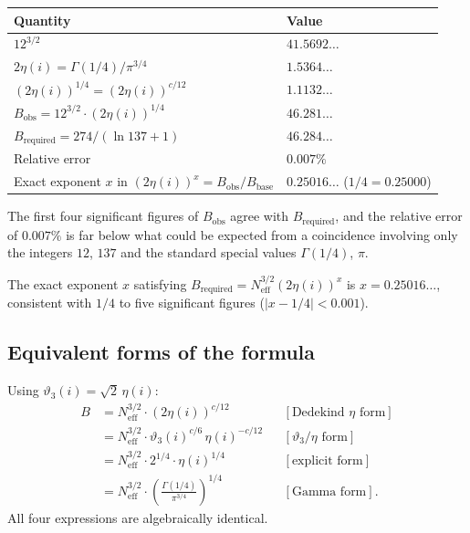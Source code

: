 \documentclass[12pt,a4paper]{article}
\theoremstyle{definition}
\theoremstyle{remark}
\begin{document}
\begin{center}
\renewcommand{\arraystretch}{1.4}
\begin{tabular}{ll}
\toprule
Quantity & Value \\
\midrule
$12^{3/2}$ & $41.5692\ldots$ \\
$2\eta(i) = \Gamma(1/4)/\pi^{3/4}$ & $1.5364\ldots$ \\
$(2\eta(i))^{1/4} = (2\eta(i))^{c/12}$ & $1.1132\ldots$ \\
$B_{\mathrm{obs}} = 12^{3/2} \cdot (2\eta(i))^{1/4}$ & $\mathbf{46.281\ldots}$ \\
\midrule
$B_{\mathrm{required}} = 274/(\ln 137 + 1)$ & $\mathbf{46.284\ldots}$ \\
\midrule
Relative error & $\mathbf{0.007\%}$ \\
Exact exponent $x$ in $(2\eta(i))^x = B_{\mathrm{obs}}/B_{\mathrm{base}}$ & $0.25016\ldots$ ($1/4 = 0.25000$) \\
\bottomrule
\end{tabular}
\end{center}

The first four significant figures of $B_{\mathrm{obs}}$ agree with
$B_{\mathrm{required}}$, and the relative error of $0.007\%$ is far below
what could be expected from a coincidence involving only the integers $12$,
$137$ and the standard special values $\Gamma(1/4)$, $\pi$.

The exact exponent $x$ satisfying $B_{\mathrm{required}} = N_{\mathrm{eff}}^{3/2}
(2\eta(i))^x$ is $x = 0.25016\ldots$, consistent with $1/4$ to five significant
figures ($|x - 1/4| < 0.001$).

\subsection{Equivalent forms of the formula}

Using $\vartheta_3(i) = \sqrt{2}\,\eta(i)$:
\begin{align}
  B &= N_{\mathrm{eff}}^{3/2} \cdot (2\eta(i))^{c/12}
      &&[\text{Dedekind } \eta\text{ form}] \label{eq:cw:Bfull_eta} \\
    &= N_{\mathrm{eff}}^{3/2} \cdot \vartheta_3(i)^{c/6}\,\eta(i)^{-c/12}
      &&[\vartheta_3/\eta \text{ form}] \label{eq:cw:Bfull_th} \\
    &= N_{\mathrm{eff}}^{3/2} \cdot 2^{1/4} \cdot \eta(i)^{1/4}
      &&[\text{explicit form}] \label{eq:cw:Bfull_explicit} \\
    &= N_{\mathrm{eff}}^{3/2} \cdot \left(\frac{\Gamma(1/4)}{\pi^{3/4}}\right)^{1/4}
      &&[\text{Gamma form}]. \label{eq:cw:Bfull_gamma}
\end{align}
All four expressions are algebraically identical.
\end{document}
